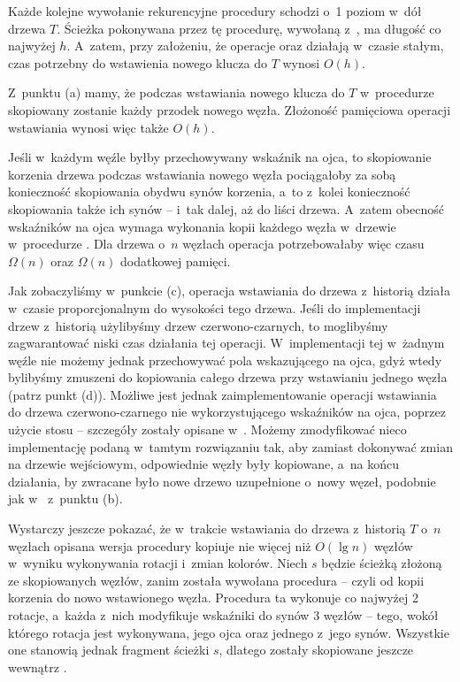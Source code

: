 \subproblem %
Każde kolejne wywołanie rekurencyjne procedury  schodzi o~1 poziom w~dół drzewa $T$.
Ścieżka pokonywana przez tę procedurę, wywołaną z~, ma długość co najwyżej $h$.
A~zatem, przy założeniu, że operacje  oraz  działają w~czasie stałym, czas potrzebny do wstawienia nowego klucza do $T$ wynosi $O(h)$.

Z~punktu (a) mamy, że podczas wstawiania nowego klucza do $T$ w~procedurze  skopiowany zostanie każdy przodek nowego węzła.
Złożoność pamięciowa operacji wstawiania wynosi więc także $O(h)$.

\subproblem %
Jeśli w~każdym węźle byłby przechowywany wskaźnik na ojca, to skopiowanie korzenia drzewa podczas wstawiania nowego węzła pociągałoby za sobą konieczność skopiowania obydwu synów korzenia, a~to z~kolei konieczność skopiowania także ich synów -- i~tak dalej, aż do liści drzewa.
A~zatem obecność wskaźników na ojca wymaga wykonania kopii każdego węzła w~drzewie w~procedurze .
Dla drzewa o~$n$ węzłach operacja  potrzebowałaby więc czasu $\Omega(n)$ oraz $\Omega(n)$ dodatkowej pamięci.

\subproblem %
Jak zobaczyliśmy w~punkcie (c), operacja wstawiania do drzewa z~historią działa w~czasie proporcjonalnym do wysokości tego drzewa.
Jeśli do implementacji drzew z~historią użylibyśmy drzew czerwono-czarnych, to moglibyśmy zagwarantować niski czas działania tej operacji.
W~implementacji tej w~żadnym węźle nie możemy jednak przechowywać pola wskazującego na ojca, gdyż wtedy bylibyśmy zmuszeni do kopiowania całego drzewa przy wstawianiu jednego węzła (patrz punkt (d)).
Możliwe jest jednak zaimplementowanie operacji wstawiania do drzewa czerwono-czarnego nie wykorzystującego wskaźników na ojca, poprzez użycie stosu -- szczegóły zostały opisane w~.
Możemy zmodyfikować nieco implementację podaną w~tamtym rozwiązaniu tak, aby zamiast dokonywać zmian na drzewie wejściowym, odpowiednie węzły były kopiowane, a~na końcu działania, by zwracane było nowe drzewo uzupełnione o~nowy węzeł, podobnie jak w~ z~punktu (b).

Wystarczy jeszcze pokazać, że w~trakcie wstawiania do drzewa z~historią $T$ o~$n$ węzłach opisana wersja procedury  kopiuje nie więcej niż $O(\lg n)$ węzłów w~wyniku wykonywania rotacji i~zmian kolorów.
Niech $s$ będzie ścieżką złożoną ze skopiowanych węzłów, zanim została wywołana procedura  -- czyli od kopii korzenia do nowo wstawionego węzła.
Procedura ta wykonuje co najwyżej 2 rotacje, a~każda z~nich modyfikuje wskaźniki do synów 3 węzłów -- tego, wokół którego rotacja jest wykonywana, jego ojca oraz jednego z~jego synów.
Wszystkie one stanowią jednak fragment ścieżki $s$, dlatego zostały skopiowane jeszcze wewnątrz .

